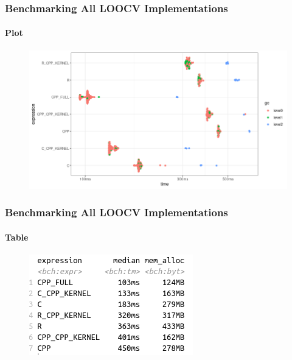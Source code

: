 \documentclass[aspectratio=169]{beamer}
\begin{document}
\begin{frame}
  \frametitle{Benchmarking All LOOCV Implementations}
  \framesubtitle{Plot}
  \begin{figure}
    \centering
    \includegraphics[scale = 0.5]{figure/CVsRcpBandwidth.png}
  \end{figure}
\end{frame}
\begin{frame}
  \frametitle{Benchmarking All LOOCV Implementations}
  \framesubtitle{Table}
  \begin{figure}
    \centering
    \includegraphics[scale = 0.7]{figure/CvsRCPPvsR_cv.png}
  \end{figure}
\end{frame}
\end{document}
